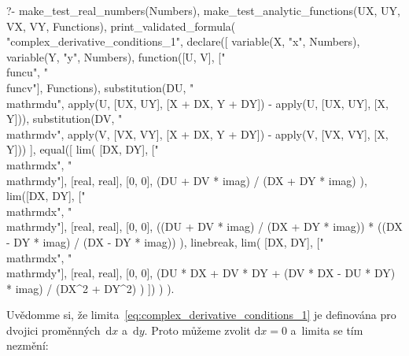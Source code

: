 \begin{prolog}
?-	make_test_real_numbers(Numbers),
	make_test_analytic_functions(UX, UY, VX, VY, Functions),
	print_validated_formula(
		"complex_derivative_conditions_1",
		declare([
			variable(X, "x", Numbers),
			variable(Y, "y", Numbers),
			function([U, V], ["\\func{u}", "\\func{v}"], Functions), 
			substitution(DU, "\\mathrm{d}u", apply(U, [UX, UY], [X + DX, Y + DY]) - apply(U, [UX, UY], [X, Y])),
			substitution(DV, "\\mathrm{d}v", apply(V, [VX, VY], [X + DX, Y + DY]) - apply(V, [VX, VY], [X, Y]))
		],
			equal([
				lim(
					[DX, DY], ["\\mathrm{d}x", "\\mathrm{d}y"], [real, real], [0, 0],
					(DU + DV * imag) / (DX + DY * imag)
				),
				lim([DX, DY], ["\\mathrm{d}x", "\\mathrm{d}y"], [real, real], [0, 0],
					((DU + DV * imag) / (DX + DY * imag)) * ((DX - DY * imag) / (DX - DY * imag))	
				),
				linebreak,
				lim(
					[DX, DY], ["\\mathrm{d}x", "\\mathrm{d}y"], [real, real], [0, 0],
					(DU * DX + DV * DY + (DV * DX - DU * DY) * imag) / (DX^2 + DY^2)
				)
			])
		)
	).
\end{prolog}

Uvědomme si, že limita~\eqref{eq:complex_derivative_conditions_1} je definována pro dvojici proměnných~\(\mathrm{d}x\) a~\(\mathrm{d}y\). Proto můžeme zvolit \(\mathrm{d}x = 0\) a~limita se tím nezmění:

